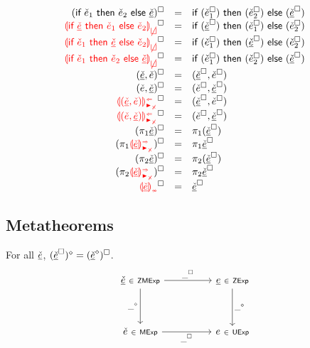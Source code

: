 \documentclass[formalism.tex]{subfiles}
\begin{document}
\[\begin{array}{rcl}
  \erasesToRow{(\ZCIfL{\ECMV_1}{\ECMV_2}{\ZCMV})}{\ZCIfR{(\erase{\ECMV_1})}{(\erase{\ECMV_2})}{(\erase{\ZCMV})}} \\
  \erasesToRow{\ZCInconBrC{\ZCMV}{\ECMV_1}{\ECMV_2}}{\ZCIfC{(\erase{\ZCMV})}{(\erase{\ECMV_1})}{(\erase{\ECMV_2})}} \\
  \erasesToRow{\ZCInconBrL{\ECMV_1}{\ZCMV}{\ECMV_2}}{\ZCIfL{(\erase{\ECMV_1})}{(\erase{\ZCMV})}{(\erase{\ECMV_2})}} \\
  \erasesToRow{\ZCInconBrR{\ECMV_1}{\ECMV_2}{\ZCMV}}{\ZCIfR{(\erase{\ECMV_1})}{(\erase{\ECMV_2})}{(\erase{\ZCMV})}} \\
  \erasesToRow{\ZCPairL{\ZCMV}{\ECMV}}{\ZCPairL{\erase{\ZCMV}}{\erase{\ECMV}}} \\
  \erasesToRow{\ZCPairR{\ECMV}{\ZCMV}}{\ZCPairR{\erase{\ECMV}}{\erase{\ZCMV}}} \\
  \erasesToRow{\ZCPairAnaNonMatchedProdL{\ZCMV}{\ECMV}}{\ZCPairL{\erase{\ZCMV}}{\erase{\ECMV}}} \\
  \erasesToRow{\ZCPairAnaNonMatchedProdR{\ECMV}{\ZCMV}}{\ZCPairR{\erase{\ECMV}}{\erase{\ZCMV}}} \\
  \erasesToRow{(\ZCProjL{\ZCMV})}{\ZCProjL{(\erase{\ZCMV})}} \\
  \erasesToRow{(\ZCProjLSynNonMatchedProd{\ZCMV})}{\ZCProjL{\erase{\ZCMV}}} \\
  \erasesToRow{(\ZCProjR{\ZCMV})}{\ZCProjR{(\erase{\ZCMV})}} \\
  \erasesToRow{(\ZCProjRSynNonMatchedProd{\ZCMV})}{\ZCProjR{\erase{\ZCMV}}} \\
  \erasesToRow{\ZCInconType{\ZCMV}}{\erase{\ZCMV}} \\
\end{array}\]

\subsection{Metatheorems}
\label{sec:typed-metatheorems}
\begin{theorem}[name=Erasure Commutativity]
  For all $\underline{\check{e}}$, $(\underline{\check{e}}^{\square})^{\diamond} = (\underline{\check{e}}^{\diamond})^{\square}$.
  \[\begin{tikzcd}
    \ZCMV \mathsmaller{~\in~ \ZCMName} && \ZMV \mathsmaller{~\in~ \ZMName} \\\\
    \ECMV \mathsmaller{~\in~ \ECMName} && \EMV \mathsmaller{~\in~ \EMName}
    \arrow["{\cursorErase{\_}}"', from=1-1, to=3-1]
    \arrow["{\erase{\_}}", from=1-1, to=1-3]
    \arrow["{\cursorErase{\_}}", from=1-3, to=3-3]
    \arrow["{\erase{\_}}"', from=3-1, to=3-3]
  \end{tikzcd}\]
\end{theorem}
\end{document}
